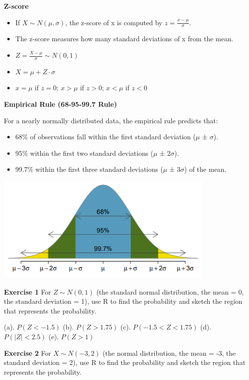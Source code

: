 \documentclass[
]{book}
\providecommand{\tightlist}{%
  \setlength{\itemsep}{0pt}\setlength{\parskip}{0pt}}
\begin{document}
\textbf{Z-score}

\begin{itemize}
\tightlist
\item
  If \(X \sim N(\mu, \sigma)\), the z-score of x is computed by \(z = \frac{x - \mu}{\sigma}\).
\item
  The z-score measures how many standard deviations of x from the mean.
\item
  \(Z = \frac{X - \mu}{\sigma} \sim N(0, 1)\)
\item
  \(X = \mu + Z \cdot \sigma\)
\item
  \(x = \mu\) if \(z = 0\); \(x > \mu\) if \(z > 0\); \(x < \mu\) if \(z < 0\)
\end{itemize}

\textbf{Empirical Rule (68-95-99.7 Rule)}

For a nearly normally distributed data, the empirical rule predicts that:

\begin{itemize}
\tightlist
\item
  68\% of observations fall within the first standard deviation (\(\mu\) ± \(\sigma\)).
\item
  95\% within the first two standard deviations (\(\mu\) ± 2\(\sigma\)).
\item
  99.7\% within the first three standard deviations (\(\mu\) ± 3\(\sigma\)) of the mean.
\end{itemize}

\includegraphics[width=4.25in,height=\textheight]{images/img47.png}

\textbf{Exercise 1} For \(Z \sim N(0, 1)\) (the standard normal distribution, the mean = 0, the standard deviation = 1), use R to find the probability and sketch the region that represents the probability.

(a). \(P(Z < -1.5)\) (b). \(P(Z > 1.75)\) (c). \(P(-1.5 < Z < 1.75)\) (d). \(P(|Z| < 2.5)\) (e). \(P(Z > 1)\)

\textbf{Exercise 2} For \(X \sim N(-3, 2)\) (the normal distribution, the mean = -3, the standard deviation = 2), use R to find the probability and sketch the region that represents the probability.
\end{document}
